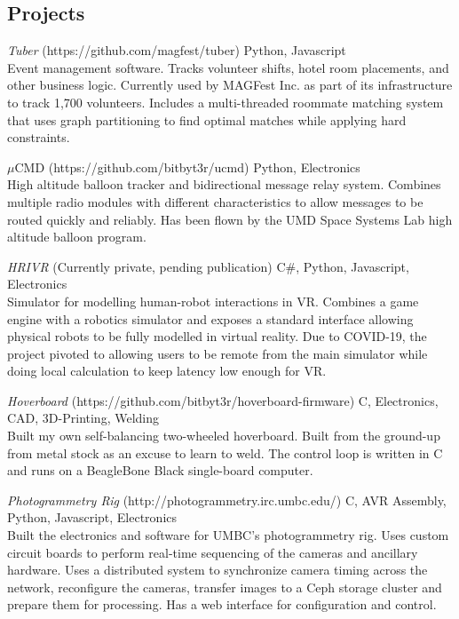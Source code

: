 \documentclass[line]{resume}
\begin{document}
\begin{resume}
\section{Projects}
    {\sl Tuber} (https://github.com/magfest/tuber) \hfill Python, Javascript \\
        Event management software. Tracks volunteer shifts, hotel room placements, and other business logic. Currently used by MAGFest Inc. as part of its infrastructure to track 1,700 volunteers. Includes a multi-threaded roommate matching system that uses graph partitioning to find optimal matches while applying hard constraints.
        
    $\mu$CMD (https://github.com/bitbyt3r/ucmd) \hfill Python, Electronics \\
        High altitude balloon tracker and bidirectional message relay system. Combines multiple radio modules with different characteristics to allow messages to be routed quickly and reliably. Has been flown by the UMD Space Systems Lab high altitude balloon program.
        
    {\sl HRIVR } (Currently private, pending publication) \hfill C\#, Python, Javascript, Electronics \\
        Simulator for modelling human-robot interactions in VR. Combines a game engine with a robotics simulator and exposes a standard interface allowing physical robots to be fully modelled in virtual reality. Due to COVID-19, the project pivoted to allowing users to be remote from the main simulator while doing local calculation to keep latency low enough for VR.

    {\sl Hoverboard } (https://github.com/bitbyt3r/hoverboard-firmware) \hfill C, Electronics, CAD, 3D-Printing, Welding \\
        Built my own self-balancing two-wheeled hoverboard. Built from the ground-up from metal stock as an excuse to learn to weld. The control loop is written in C and runs on a BeagleBone Black single-board computer. 

    {\sl Photogrammetry Rig } (http://photogrammetry.irc.umbc.edu/) \hfill C, AVR Assembly, Python, Javascript, Electronics \\
        Built the electronics and software for UMBC's photogrammetry rig. Uses custom circuit boards to perform real-time sequencing of the cameras and ancillary hardware. Uses a distributed system to synchronize camera timing across the network, reconfigure the cameras, transfer images to a Ceph storage cluster and prepare them for processing. Has a web interface for configuration and control.
        
\end{resume}
\end{document}
